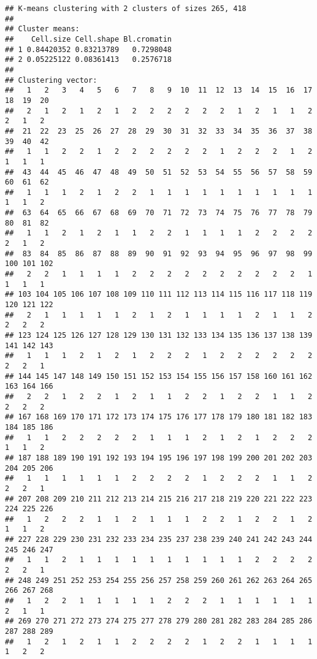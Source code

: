\documentclass[]{article}
\begin{document}
\begin{verbatim}
## K-means clustering with 2 clusters of sizes 265, 418
## 
## Cluster means:
##    Cell.size Cell.shape Bl.cromatin
## 1 0.84420352 0.83213789   0.7298048
## 2 0.05225122 0.08361413   0.2576718
## 
## Clustering vector:
##   1   2   3   4   5   6   7   8   9  10  11  12  13  14  15  16  17  18  19  20 
##   2   1   2   1   2   1   2   2   2   2   2   2   1   2   1   1   2   2   1   2 
##  21  22  23  25  26  27  28  29  30  31  32  33  34  35  36  37  38  39  40  42 
##   1   1   2   2   1   2   2   2   2   2   2   1   2   2   2   1   2   1   1   1 
##  43  44  45  46  47  48  49  50  51  52  53  54  55  56  57  58  59  60  61  62 
##   1   1   1   2   1   2   2   1   1   1   1   1   1   1   1   1   1   1   1   2 
##  63  64  65  66  67  68  69  70  71  72  73  74  75  76  77  78  79  80  81  82 
##   1   1   2   1   2   1   1   2   2   1   1   1   1   2   2   2   2   2   1   2 
##  83  84  85  86  87  88  89  90  91  92  93  94  95  96  97  98  99 100 101 102 
##   2   2   1   1   1   1   2   2   2   2   2   2   2   2   2   2   1   1   1   1 
## 103 104 105 106 107 108 109 110 111 112 113 114 115 116 117 118 119 120 121 122 
##   2   1   1   1   1   1   2   1   2   1   1   1   1   2   1   1   2   2   2   2 
## 123 124 125 126 127 128 129 130 131 132 133 134 135 136 137 138 139 141 142 143 
##   1   1   1   2   1   2   1   2   2   2   1   2   2   2   2   2   2   2   2   1 
## 144 145 147 148 149 150 151 152 153 154 155 156 157 158 160 161 162 163 164 166 
##   2   2   1   2   2   1   2   1   1   2   2   1   2   2   1   1   2   2   2   2 
## 167 168 169 170 171 172 173 174 175 176 177 178 179 180 181 182 183 184 185 186 
##   1   1   2   2   2   2   2   1   1   1   2   1   2   1   2   2   2   1   1   2 
## 187 188 189 190 191 192 193 194 195 196 197 198 199 200 201 202 203 204 205 206 
##   1   1   1   1   1   1   2   2   2   2   1   2   2   2   1   1   2   2   2   1 
## 207 208 209 210 211 212 213 214 215 216 217 218 219 220 221 222 223 224 225 226 
##   1   2   2   2   1   1   2   1   1   1   2   2   1   2   2   1   2   1   1   2 
## 227 228 229 230 231 232 233 234 235 237 238 239 240 241 242 243 244 245 246 247 
##   1   1   2   1   1   1   1   1   1   1   1   1   1   2   2   2   2   2   2   1 
## 248 249 251 252 253 254 255 256 257 258 259 260 261 262 263 264 265 266 267 268 
##   1   2   2   1   1   1   1   1   2   2   2   1   1   1   1   1   1   2   1   1 
## 269 270 271 272 273 274 275 277 278 279 280 281 282 283 284 285 286 287 288 289 
##   1   2   1   2   1   1   2   2   2   2   1   2   2   1   1   1   1   1   2   2 

\end{verbatim}
\end{document}
